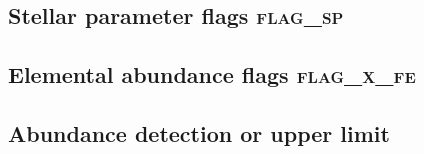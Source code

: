 \documentclass[
  journal=pasa,
  manuscript=research-paper, %
  year=2023,
  volume=37
]{cup-journal}
\begin{document}
\subsection{Stellar parameter flags \textsc{flag\_sp}}
\label{sec:flag_sp}


\subsection{Elemental abundance flags \textsc{flag\_x\_fe}}
\label{sec:flag_x_fe}


\subsection{Abundance detection or upper limit}
\label{sec:abundance_detection_or_upper_limit}
\end{document}
